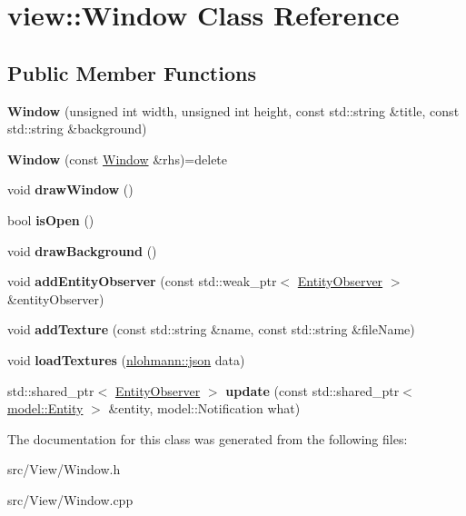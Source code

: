 \hypertarget{classview_1_1_window}{}\section{view\+:\+:Window Class Reference}
\label{classview_1_1_window}
\subsection*{Public Member Functions}
\begin{DoxyCompactItemize}
\item 
\mbox{\label{classview_1_1_window_aa15b3a4eafcbea4baa9027f25ac78343}} 
{\bfseries Window} (unsigned int width, unsigned int height, const std\+::string \&title, const std\+::string \&background)
\item 
\mbox{\label{classview_1_1_window_aad87ab669ba1aa24f2dbd47f55136917}} 
{\bfseries Window} (const \mbox{\hyperlink{classview_1_1_window}{Window}} \&rhs)=delete
\item 
\mbox{\label{classview_1_1_window_a94b6a70f03d9b359e2853d6f34457226}} 
void {\bfseries draw\+Window} ()
\item 
\mbox{\label{classview_1_1_window_a5968d154bebea2940b26b0f78da04322}} 
bool {\bfseries is\+Open} ()
\item 
\mbox{\label{classview_1_1_window_a67e28cc4888657df2ef1dd5ad7942ab1}} 
void {\bfseries draw\+Background} ()
\item 
\mbox{\label{classview_1_1_window_a6ac55efede37e4df42667acc0f5f63ae}} 
void {\bfseries add\+Entity\+Observer} (const std\+::weak\+\_\+ptr$<$ \mbox{\hyperlink{classview_1_1_entity_observer}{Entity\+Observer}} $>$ \&entity\+Observer)
\item 
\mbox{\label{classview_1_1_window_a4f3e81bbbf9c97e8d06e50a960018638}} 
void {\bfseries add\+Texture} (const std\+::string \&name, const std\+::string \&file\+Name)
\item 
\mbox{\label{classview_1_1_window_a1e74608a737b8cd96696b0765475edd5}} 
void {\bfseries load\+Textures} (\mbox{\hyperlink{namespacenlohmann_a2bfd99e845a2e5cd90aeaf1b1431f474}{nlohmann\+::json}} data)
\item 
\mbox{\label{classview_1_1_window_a38b7ac2b0cb0b236b3a3e6fbdf8301db}} 
std\+::shared\+\_\+ptr$<$ \mbox{\hyperlink{classview_1_1_entity_observer}{Entity\+Observer}} $>$ {\bfseries update} (const std\+::shared\+\_\+ptr$<$ \mbox{\hyperlink{classmodel_1_1_entity}{model\+::\+Entity}} $>$ \&entity, model\+::\+Notification what)
\end{DoxyCompactItemize}


The documentation for this class was generated from the following files\+:\begin{DoxyCompactItemize}
\item 
src/\+View/Window.\+h\item 
src/\+View/Window.\+cpp\end{DoxyCompactItemize}
